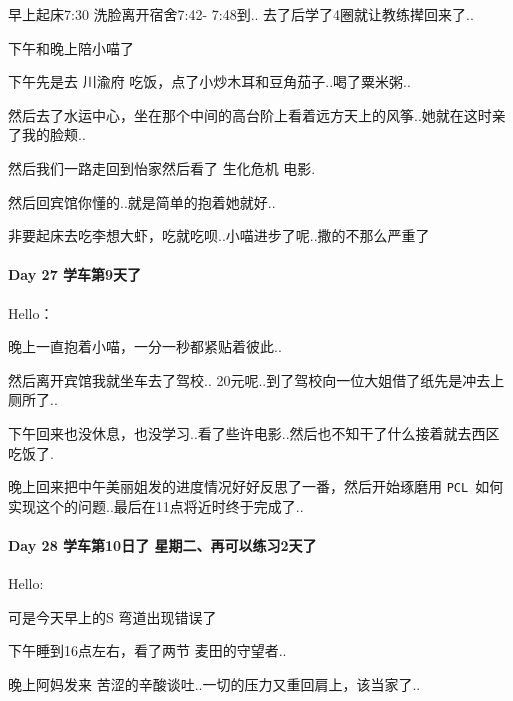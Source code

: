\documentclass[UTF8,a4paper,8pt]{ctexart}
\begin{document}
	 	 早上起床7:30 洗脸离开宿舍7:42- 7:48到.. 去了后学了4圈就让教练撵回来了..
	 	 
	 	 下午和晚上陪小喵了
	 	 
	 	 下午先是去 川渝府 吃饭，点了小炒木耳和豆角茄子..喝了粟米粥..
	 	 
	 	 然后去了水运中心，坐在那个中间的高台阶上看着远方天上的风筝..她就在这时亲了我的脸颊..
	 	 
	 	 然后我们一路走回到怡家然后看了 生化危机 电影.
	 	 
	 	 然后回宾馆你懂的..就是简单的抱着她就好..
	 	 
	 	 非要起床去吃李想大虾，吃就吃呗..小喵进步了呢..撒的不那么严重了
 	 \paragraph{Day 27  学车第9天了   \quad     }Hello：
	 	 
	 	 晚上一直抱着小喵，一分一秒都紧贴着彼此..
	 	 
	 	 然后离开宾馆我就坐车去了驾校.. 20元呢..到了驾校向一位大姐借了纸先是冲去上厕所了..
	 	 
	 	 下午回来也没休息，也没学习..看了些许电影..然后也不知干了什么接着就去西区吃饭了.
	 	 
	 	 晚上回来把中午美丽姐发的进度情况好好反思了一番，然后开始琢磨用 \verb|PCL |如何实现这个的问题..最后在11点将近时终于完成了..
	 	  
 	 \paragraph{Day 28  学车第10日了    \quad  星期二、再可以练习2天了   }Hello:
 	 
	 	 可是今天早上的S 弯道出现错误了
	 	 
	 	 下午睡到16点左右，看了两节 麦田的守望者..
	 	 
	 	 晚上阿妈发来 苦涩的辛酸谈吐..一切的压力又重回肩上，该当家了..
	 	 
\end{document}
